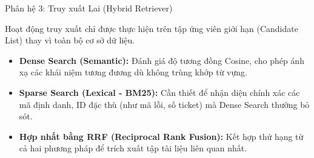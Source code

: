 \documentclass[aspectratio=169, xcolor=table]{beamer}
\begin{document}
\begin{frame}{Phân hệ 3: Truy xuất Lai (Hybrid Retriever)}
    \begin{successbox}
        \small Hoạt động truy xuất chỉ được thực hiện trên tập ứng viên giới hạn (Candidate List) thay vì toàn bộ cơ sở dữ liệu.
    \end{successbox}
    
    \vspace{0.3cm}
    
    \begin{itemize}
        \small
        \item \textbf{Dense Search (Semantic):} Đánh giá độ tương đồng Cosine, cho phép ánh xạ các khái niệm tương đương dù không trùng khớp từ vựng.
        \item \textbf{Sparse Search (Lexical - BM25):} Cần thiết để nhận diện chính xác các mã định danh, ID đặc thù (như mã lỗi, số ticket) mà Dense Search thường bỏ sót.
        \item \textbf{Hợp nhất bằng RRF (Reciprocal Rank Fusion):} Kết hợp thứ hạng từ cả hai phương pháp để trích xuất tập tài liệu liên quan nhất.
    \end{itemize}
\end{frame}
\end{document}
